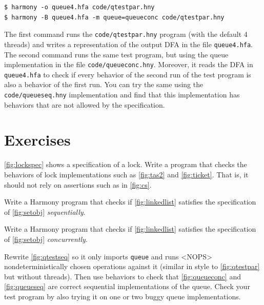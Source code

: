 \documentclass{report}
\newenvironment{code}{
\tcolorbox
}{
\endtcolorbox
}
\begin{document}
\begin{code}
\begin{verbatim}
$ harmony -o queue4.hfa code/qtestpar.hny
$ harmony -B queue4.hfa -m queue=queueconc code/qtestpar.hny
\end{verbatim}
\end{code}

The first command runs the \texttt{code/qtestpar.hny} program (with the
default 4 threads)
and writes a representation of the output DFA in the file \texttt{queue4.hfa}.
The second command runs the same test program, but using the queue
implementation in the file \texttt{code/queueconc.hny}.  Moreover, it reads
the DFA in \texttt{queue4.hfa} to check if every behavior of the second
run of the test program is also a behavior of the first run.
You can try the same using the \texttt{code/queueseq.hny} implementation
and find that this implementation has behaviors that are not allowed by
the specification.

\section*{Exercises}
\begin{problems}
\item \autoref{fig:lockspec} shows a specification of a lock.  Write a program
that checks the behaviors of lock implementations such as \autoref{fig:tas2}
and \autoref{fig:ticket}.  That is, it should not rely on assertions such as
in \autoref{fig:cs}.
\item Write a Harmony program that checks if
\autoref{fig:linkedlist} satisfies the specification
of \autoref{fig:setobj} \emph{sequentially}.
\item Write a Harmony program that checks if
\autoref{fig:linkedlist} satisfies the specification
of \autoref{fig:setobj} \emph{concurrently}.
\item Rewrite \autoref{fig:qtestseq} so it only imports \texttt{queue}
and runs <{NOPS}> nondeterministically chosen operations against
it (similar in style to \autoref{fig:qtestpar} but without threads).
Then use behaviors to check that \autoref{fig:queueconc} and
\autoref{fig:queueseq} are correct sequential implementations of
the queue.  Check your test program by also trying it on one or two
buggy queue implementations.
\end{problems}
\end{document}
